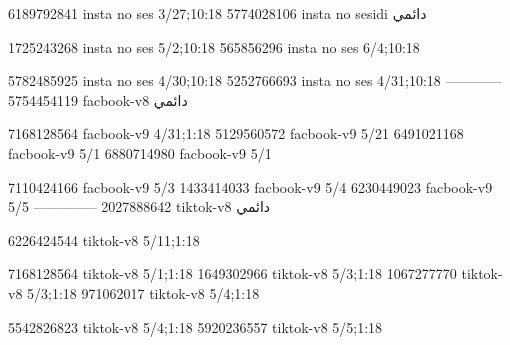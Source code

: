 
6189792841 insta no ses
3/27;10:18
5774028106 insta no sesidi
دائمي


1725243268 insta no ses
5/2;10:18
565856296 insta no ses
6/4;10:18

5782485925 insta no ses
4/30;10:18
5252766693 insta no ses
4/31;10:18
------------
5754454119 facbook-v8
دائمي

7168128564 facbook-v9
4/31;1:18
5129560572 facbook-v9
5/21
6491021168 facbook-v9
5/1
6880714980 facbook-v9
5/1

7110424166 facbook-v9
5/3
1433414033 facbook-v9
5/4
6230449023 facbook-v9
5/5
--------------
2027888642 tiktok-v8
دائمي

6226424544 tiktok-v8
5/11;1:18

7168128564 tiktok-v8
5/1;1:18
1649302966 tiktok-v8
5/3;1:18
1067277770 tiktok-v8
5/3;1:18
971062017 tiktok-v8
5/4;1:18

5542826823 tiktok-v8
5/4;1:18
5920236557 tiktok-v8
5/5;1:18

